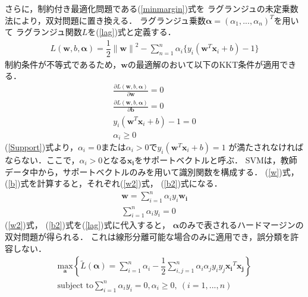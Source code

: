 さらに，制約付き最適化問題である(\ref{minmargin})式を
ラグランジュの未定乗数法により，双対問題に置き換える．
ラグランジュ乗数$\boldsymbol{\alpha} = (\alpha_1,...,\alpha_n)^T$を用いて
ラグランジュ関数$L$を(\ref{lag})式と定義する．
\begin{align}
    \label{lag}
    L(\boldsymbol{w},b,\boldsymbol{\alpha}) 
    = \dfrac{1}{2}{\|\boldsymbol{{w}}\|}^2
    - \sum_{n = 1}^{n} \alpha_i \{y_i(\boldsymbol{w}^T \boldsymbol{x}_i + b)-1\}
\end{align}
制約条件が不等式であるため，$\boldsymbol{w}$の最適解のおいて以下のKKT条件が適用できる．
\begin{subequations}
\begin{align}
   \frac{\partial L(\boldsymbol{w},b,\boldsymbol{\alpha})}{\partial \boldsymbol{w}} = 0\label{w}\\
    \frac{\partial L(\boldsymbol{w},b,\boldsymbol{\alpha})}{\partial \boldsymbol{b}} = 0\label{b}\\
    y_i(\boldsymbol{w}^T \boldsymbol{x}_i + b)-1 = 0\label{Support}\\
    \alpha_i \geq 0
\end{align}
\end{subequations}
(\ref{Support})式より，$\alpha_i = 0$または$\alpha_i > 0$で$y_i(\boldsymbol{w}^T \boldsymbol{x}_i + b)=1$
が満たされなければならない．ここで，$\alpha_i > 0$となる$\boldsymbol{x_i}$をサポートベクトルと呼ぶ．
SVMは，教師データ中から，サポートベクトルのみを用いて識別関数を構成する．
 (\ref{w})式， (\ref{b})式を計算すると，それぞれ(\ref{w2})式， (\ref{b2})式になる．
 \begin{subequations}
 \begin{align}
   \boldsymbol{w} = \sum_{i=1}^{n}\alpha_i y_i \boldsymbol{w_i} \label{w2}\\
   \sum_{i=1}^{n}\alpha_i y_i = 0 \label{b2}
 \end{align}
\end{subequations}
(\ref{w2})式， (\ref{b2})式を(\ref{lag})式に代入すると，
$\boldsymbol{\alpha}$のみで表されるハードマージンの双対問題が得られる．
これは線形分離可能な場合のみに適用でき，誤分類を許容しない．
\begin{align}
    \underset{\boldsymbol{a}}{\text{max}} \left\{\tilde{L}(\boldsymbol{\alpha}) 
    = \sum_{i=1}^{n}\alpha_i - \dfrac{1}{2}\sum_{i,j=1}^{n}
    \alpha_i\alpha_j y_i y_j \boldsymbol{x_i}^T \boldsymbol{x_j}\right\} \nonumber \\
    \text{subject to} \sum_{i=1}^{n}\alpha_i y_i = 0, \alpha_i \geq 0,\ (i=1,...,n)
\end{align}

